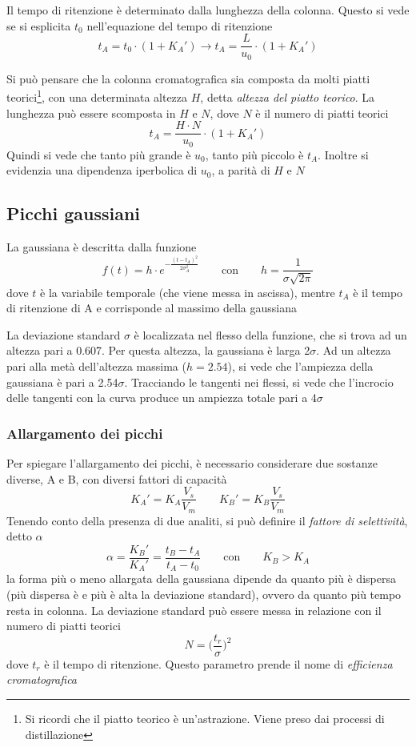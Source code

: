 Il tempo di ritenzione è determinato dalla lunghezza della colonna. Questo si vede se si esplicita $t_0$ nell'equazione del tempo di ritenzione
\[
t_A = t_0 \cdot (1 + K_A') \longrightarrow t_A = \frac{L}{u_0} \cdot (1 + K_A')
\]

Si può pensare che la colonna cromatografica sia composta da molti piatti teorici\footnote{Si ricordi che il piatto teorico è un'astrazione.
Viene preso dai processi di distillazione}, con una determinata altezza $H$, detta \emph{altezza del piatto teorico}.
La lunghezza può essere scomposta in $H$ e $N$, dove $N$ è il numero di piatti teorici
\[
t_A = \frac{H \cdot N}{u_0} \cdot (1 + K_A')
\]
Quindi si vede che tanto più grande è $u_0$, tanto più piccolo è $t_A$. Inoltre si evidenzia una dipendenza iperbolica di $u_0$, a parità di $H$ e $N$
\subsection{Picchi gaussiani}
La gaussiana è descritta dalla funzione
\[
f(t) = h \cdot e^{-\frac{(t-t_A)^2}{2\sigma^2_A}} \qquad \text{con} \qquad h = \frac{1}{\sigma \sqrt{2\pi}}
\]
dove $t$ è la variabile temporale (che viene messa in ascissa), mentre $t_A$ è il tempo di ritenzione di A e corrisponde al massimo della gaussiana


La deviazione standard $\sigma$ è localizzata nel flesso della funzione, che si trova ad un altezza pari a 0.607.
Per questa altezza, la gaussiana è larga 2$\sigma$.
Ad un altezza pari alla metà dell'altezza massima ($h = 2.54$), si vede che l'ampiezza della gaussiana è pari a 2.54$\sigma$.
Tracciando le tangenti nei flessi, si vede che l'incrocio delle tangenti con la curva produce un ampiezza totale pari a 4$\sigma$
\subsubsection{Allargamento dei picchi}
Per spiegare l'allargamento dei picchi, è necessario considerare due sostanze diverse, A e B, con diversi fattori di capacità
\[
K_A' = K_A \frac{V_s}{V_m} \qquad K_B' = K_B \frac{V_s}{V_m} 
\]
Tenendo conto della presenza di due analiti, si può definire il \emph{fattore di selettività}, detto $\alpha$
\[
\alpha = \frac{K_B'}{K_A'} = \frac{t_B - t_A}{t_A - t_0} \qquad \text{con} \qquad K_B > K_A
\]
la forma più o meno allargata della gaussiana dipende da quanto più è dispersa (più dispersa è e più è alta la deviazione standard), 
ovvero da quanto più tempo resta in colonna. La deviazione standard può essere messa in relazione con il numero di piatti teorici
\[
N = \biggl(\frac{t_r}{\sigma}\biggr)^2
\]
dove $t_r$ è il tempo di ritenzione. Questo parametro prende il nome di \emph{efficienza cromatografica}

